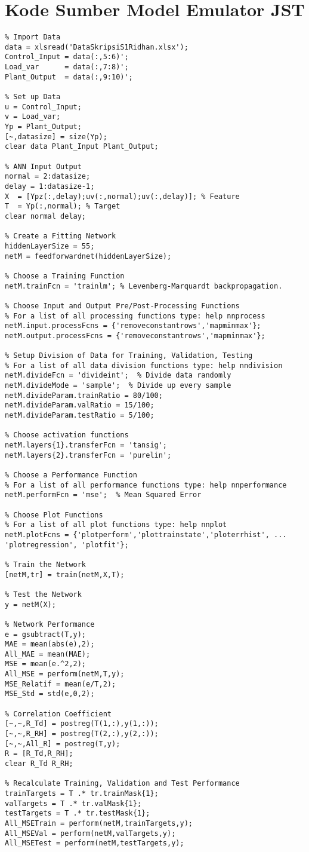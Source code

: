\section{Kode Sumber Model Emulator JST}
\begin{lstlisting}
% Import Data
data = xlsread('DataSkripsiS1Ridhan.xlsx');
Control_Input = data(:,5:6)';
Load_var      = data(:,7:8)';
Plant_Output  = data(:,9:10)';

% Set up Data
u = Control_Input;
v = Load_var;
Yp = Plant_Output;
[~,datasize] = size(Yp);
clear data Plant_Input Plant_Output;

% ANN Input Output
normal = 2:datasize;
delay = 1:datasize-1;
X  = [Ypz(:,delay);uv(:,normal);uv(:,delay)]; % Feature
T  = Yp(:,normal); % Target
clear normal delay;

% Create a Fitting Network
hiddenLayerSize = 55;
netM = feedforwardnet(hiddenLayerSize);

% Choose a Training Function
netM.trainFcn = 'trainlm'; % Levenberg-Marquardt backpropagation.

% Choose Input and Output Pre/Post-Processing Functions
% For a list of all processing functions type: help nnprocess
netM.input.processFcns = {'removeconstantrows','mapminmax'};
netM.output.processFcns = {'removeconstantrows','mapminmax'};

% Setup Division of Data for Training, Validation, Testing
% For a list of all data division functions type: help nndivision
netM.divideFcn = 'divideint';  % Divide data randomly
netM.divideMode = 'sample';  % Divide up every sample
netM.divideParam.trainRatio = 80/100;
netM.divideParam.valRatio = 15/100;
netM.divideParam.testRatio = 5/100;

% Choose activation functions
netM.layers{1}.transferFcn = 'tansig';
netM.layers{2}.transferFcn = 'purelin';

% Choose a Performance Function
% For a list of all performance functions type: help nnperformance
netM.performFcn = 'mse';  % Mean Squared Error

% Choose Plot Functions
% For a list of all plot functions type: help nnplot
netM.plotFcns = {'plotperform','plottrainstate','ploterrhist', ...
'plotregression', 'plotfit'};

% Train the Network
[netM,tr] = train(netM,X,T);

% Test the Network
y = netM(X);

% Network Performance
e = gsubtract(T,y);
MAE = mean(abs(e),2);
All_MAE = mean(MAE);
MSE = mean(e.^2,2);
All_MSE = perform(netM,T,y);
MSE_Relatif = mean(e/T,2);
MSE_Std = std(e,0,2);

% Correlation Coefficient
[~,~,R_Td] = postreg(T(1,:),y(1,:));
[~,~,R_RH] = postreg(T(2,:),y(2,:));
[~,~,All_R] = postreg(T,y);
R = [R_Td,R_RH];
clear R_Td R_RH;

% Recalculate Training, Validation and Test Performance
trainTargets = T .* tr.trainMask{1};
valTargets = T .* tr.valMask{1};
testTargets = T .* tr.testMask{1};
All_MSETrain = perform(netM,trainTargets,y);
All_MSEVal = perform(netM,valTargets,y);
All_MSETest = perform(netM,testTargets,y);
\end{lstlisting}
\hfill

